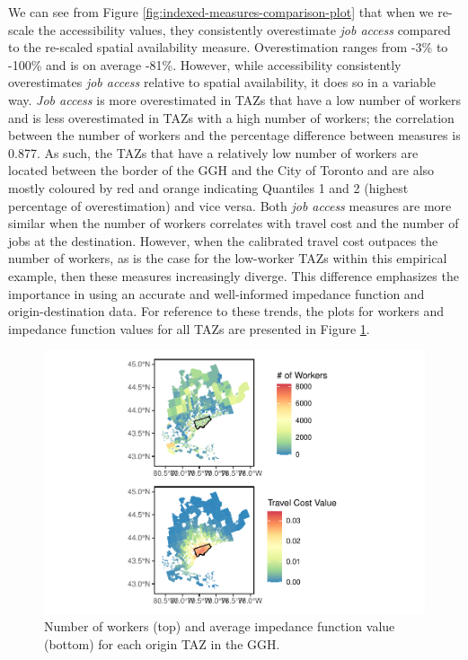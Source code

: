 \documentclass[]{elsarticle} %
\begin{document}
We can see from Figure \ref{fig:indexed-measures-comparison-plot} that
when we re-scale the accessibility values, they consistently
overestimate \emph{job access} compared to the re-scaled spatial
availability measure. Overestimation ranges from -3\% to -100\% and is
on average -81\%. However, while accessibility consistently
overestimates \emph{job access} relative to spatial availability, it
does so in a variable way. \emph{Job access} is more overestimated in
TAZs that have a low number of workers and is less overestimated in TAZs
with a high number of workers; the correlation between the number of
workers and the percentage difference between measures is 0.877. As
such, the TAZs that have a relatively low number of workers are located
between the border of the GGH and the City of Toronto and are also
mostly coloured by red and orange indicating Quantiles 1 and 2 (highest
percentage of overestimation) and vice versa. Both \emph{job access}
measures are more similar when the number of workers correlates with
travel cost and the number of jobs at the destination. However, when the
calibrated travel cost outpaces the number of workers, as is the case
for the low-worker TAZs within this empirical example, then these
measures increasingly diverge. This difference emphasizes the importance
in using an accurate and well-informed impedance function and
origin-destination data. For reference to these trends, the plots for
workers and impedance function values for all TAZs are presented in
Figure \ref{fig:plot-workers-imp}.

\begin{figure}
\includegraphics[width=1\linewidth]{Spatial-Availability_files/figure-latex/plot-workers-imp-1} \caption{\label{fig:plot-workers-imp}Number of workers (top) and average impedance function value (bottom) for each origin TAZ in the GGH.}\label{fig:plot-workers-imp}
\end{figure}
\end{document}
